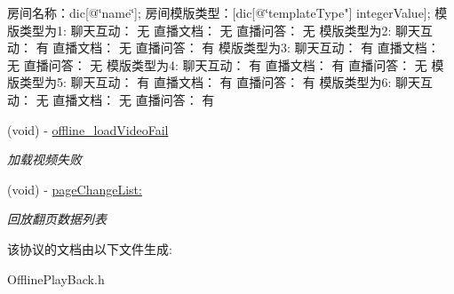 \begin{DoxyCompactItemize}
\begin{DoxyCompactList}
房间名称：dic\mbox{[}@\char`\"{}name\char`\"{}\mbox{]};
房间模版类型：\mbox{[}dic\mbox{[}@\char`\"{}template\+Type"\mbox{]} integer\+Value\mbox{]}; 模版类型为1\+: 聊天互动： 无 直播文档： 无 直播问答： 无 模版类型为2\+: 聊天互动： 有 直播文档： 无 直播问答： 有 模版类型为3\+: 聊天互动： 有 直播文档： 无 直播问答： 无 模版类型为4\+: 聊天互动： 有 直播文档： 有 直播问答： 无 模版类型为5\+: 聊天互动： 有 直播文档： 有 直播问答： 有 模版类型为6\+: 聊天互动： 无 直播文档： 无 直播问答： 有 \end{DoxyCompactList}\item 
\mbox{\label{protocol_offline_play_back_delegate_01-p_aa08d85a0bcfdc600d09e4cc676df9131}} 
(void) -\/ \hyperlink{protocol_offline_play_back_delegate_01-p_aa08d85a0bcfdc600d09e4cc676df9131}{offline\+\_\+load\+Video\+Fail}
\begin{DoxyCompactList}\small\item\em 加载视频失败 \end{DoxyCompactList}\item 
\mbox{\label{protocol_offline_play_back_delegate_01-p_acb8b76f265c8e351998a10898ce68c6f}} 
(void) -\/ \hyperlink{protocol_offline_play_back_delegate_01-p_acb8b76f265c8e351998a10898ce68c6f}{page\+Change\+List\+:}
\begin{DoxyCompactList}\small\item\em 回放翻页数据列表 \end{DoxyCompactList}\end{DoxyCompactItemize}


该协议的文档由以下文件生成\+:\begin{DoxyCompactItemize}
\item 
Offline\+Play\+Back.\+h\end{DoxyCompactItemize}
